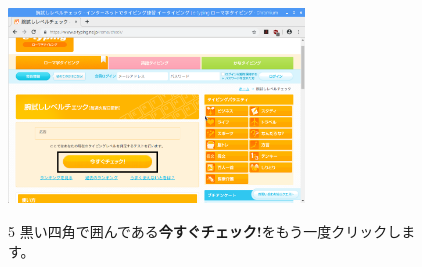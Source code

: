 \documentclass[a4paper,12pt]{jarticle}
\begin{document}
\begin{figure}
  \centering
  \includegraphics[width=0.7\textwidth]{textbook-img088.png}

  \begin{minipage}{0.7\textwidth}
    5 黒い四角で囲んである\textbf{今すぐチェック!}をもう一度クリックします。
  \end{minipage}
\end{figure}
\end{document}
